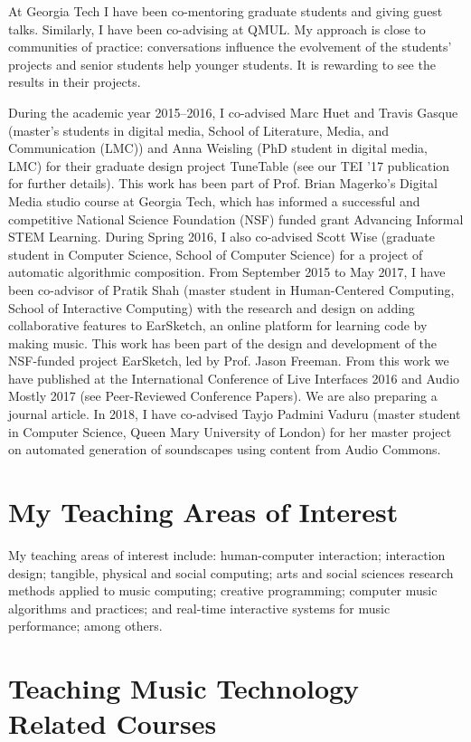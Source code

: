 \documentclass[10pt, a4paper]{article}
\begin{document}
At Georgia Tech I have been co-mentoring graduate students and giving guest talks. Similarly, I have been co-advising at QMUL. My approach is close to communities of practice: conversations influence the evolvement of the students' projects and senior students help younger students. It is rewarding to see the results in their projects.

During the academic year 2015--2016, I co-advised Marc Huet and Travis Gasque (master's students in digital media, School of Literature, Media, and Communication (LMC)) and Anna Weisling (PhD student in digital media, LMC) for their graduate design project TuneTable (see our TEI '17 publication for further details). This work has been part of Prof. Brian Magerko’s Digital Media studio course at Georgia Tech, which has informed a successful and competitive National Science Foundation (NSF) funded grant Advancing Informal STEM Learning. During Spring 2016, I also co-advised Scott Wise (graduate student in Computer Science, School of Computer Science) for a project of automatic algorithmic composition. From September 2015 to May 2017, I have been co-advisor of Pratik Shah (master student in Human-Centered Computing, School of Interactive Computing) with the research and design on adding collaborative features to EarSketch, an online platform for learning code by making music. This work has been part of the design and development of the NSF-funded project EarSketch, led by Prof. Jason Freeman. From this work we have published at the International Conference of Live Interfaces 2016 and Audio Mostly 2017 (see Peer-Reviewed Conference Papers). We are also preparing a journal article.
In 2018, I have co-advised Tayjo Padmini Vaduru (master student in Computer Science, Queen Mary University of London) for her master project on automated generation of soundscapes using content from Audio Commons.

\section*{My Teaching Areas of Interest}

My teaching areas of interest include: human-computer interaction; interaction design; tangible, physical and social computing; arts and social sciences research methods applied to music computing; creative programming; computer music algorithms and practices; and real-time interactive systems for music performance; among others. 

\section*{Teaching Music Technology Related Courses}
\end{document}

